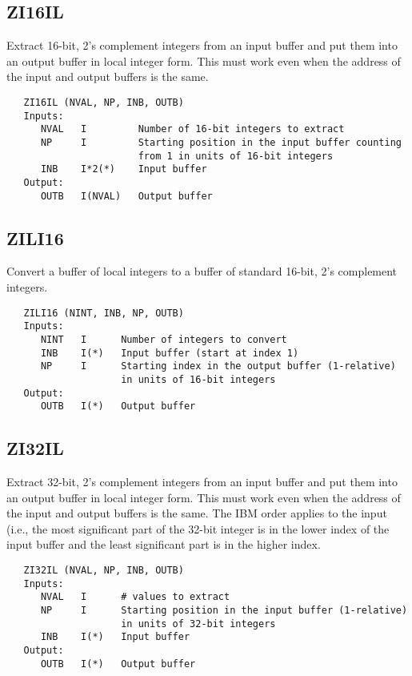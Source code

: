 \subsection{ZI16IL}
Extract 16-bit, 2's complement integers from an input buffer and
put them into an output buffer in local integer form.  This must
work even when the address of the input and output buffers is the
same.
\begin{verbatim}
   ZI16IL (NVAL, NP, INB, OUTB)
   Inputs:
      NVAL   I         Number of 16-bit integers to extract
      NP     I         Starting position in the input buffer counting
                       from 1 in units of 16-bit integers
      INB    I*2(*)    Input buffer
   Output:
      OUTB   I(NVAL)   Output buffer

\end{verbatim}

\subsection{ZILI16}
Convert a buffer of local integers to a buffer of standard 16-bit,
2's complement integers.
\begin{verbatim}
   ZILI16 (NINT, INB, NP, OUTB)
   Inputs:
      NINT   I      Number of integers to convert
      INB    I(*)   Input buffer (start at index 1)
      NP     I      Starting index in the output buffer (1-relative)
                    in units of 16-bit integers
   Output:
      OUTB   I(*)   Output buffer

\end{verbatim}

\subsection{ZI32IL}
Extract 32-bit, 2's complement integers from an input buffer and put
them into an output buffer in local integer form.  This must
work even when the address of the input and output buffers is the
same.  The IBM order applies to the input (i.e., the most
significant part of the 32-bit integer is in the lower index of the
input buffer and the least significant part is in the higher index.
\begin{verbatim}
   ZI32IL (NVAL, NP, INB, OUTB)
   Inputs:
      NVAL   I      # values to extract
      NP     I      Starting position in the input buffer (1-relative)
                    in units of 32-bit integers
      INB    I(*)   Input buffer
   Output:
      OUTB   I(*)   Output buffer

\end{verbatim}

